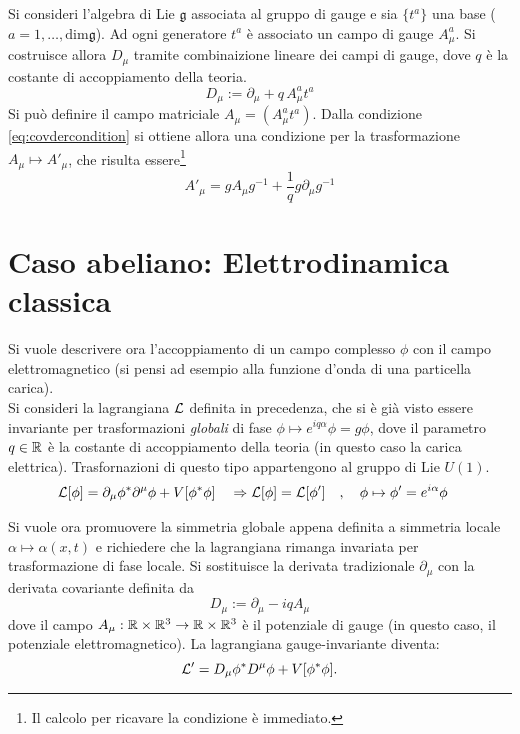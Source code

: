 Si consideri l'algebra di Lie $\mathfrak{g}$ associata al gruppo di gauge e sia
$\{ t^a \}$ una base ($a = 1, \dots, \mathrm{dim}\mathfrak{g}$). Ad ogni generatore
$ t^a $ è associato un campo di gauge $ A^a_\mu $. Si costruisce allora $ D _\mu $ tramite
combinaizione lineare dei campi di gauge, dove $q$ è la costante di accoppiamento della
teoria.
\begin{equation}
   D _\mu := \partial _\mu + q \, A^a_\mu t^a
\end{equation}
Si può definire il campo matriciale $A _\mu = (A^a_\mu t^a)$. Dalla condizione
\ref{eq:covdercondition} si ottiene allora una condizione per la trasformazione
 $A _\mu \mapsto A' _\mu$, che risulta essere\footnote{ Il calcolo per ricavare
la condizione è immediato.}
\begin{equation}\label{eq:gaugetrasform}
   A'_\mu = g A_\mu g^{-1} + \frac{1}{q} g \partial _\mu g^ {-1}
\end{equation}

\section{Caso abeliano: Elettrodinamica classica}
Si vuole descrivere ora l'accoppiamento di un campo complesso $\phi$ con il campo
elettromagnetico (si pensi ad esempio alla funzione d'onda di una particella carica).\\
Si consideri la lagrangiana $\mathcal{L}$ definita in precedenza, che si è già visto
essere invariante per trasformazioni \emph{globali} di fase $\phi \mapsto e^{iq\alpha}\phi = g\phi$,
dove il parametro $q \in \mathbb{R}$ è la costante di accoppiamento della teoria
(in questo caso la carica elettrica). Trasfornazioni di questo tipo appartengono
al gruppo di Lie $U(1)$.
%
\begin{equation*}
  \begin{aligned}
     \mathcal{L} [\phi] & = \partial _\mu \phi^*  \partial ^\mu \phi + V[\phi ^* \phi] &
     & \Rightarrow \mathcal{L}[\phi] = \mathcal{L}[\phi'] & ,\quad
     \phi &\mapsto \phi' = e^{i\alpha}\phi
  \end{aligned}
\end{equation*}

Si vuole ora promuovere la simmetria globale appena definita a simmetria locale
$\alpha \mapsto \alpha(x,t)$ e richiedere che la lagrangiana rimanga invariata
per trasformazione di fase locale.
Si sostituisce la derivata tradizionale $\partial _\mu$ con la derivata covariante
definita da
%
$$
   D _\mu := \partial _\mu -iq A _\mu
$$
dove il campo $A _\mu : \mathbb{R} \times \mathbb{R}^3 \to \mathbb{R} \times \mathbb{R}^3$ è il potenziale
di gauge (in questo caso, il potenziale elettromagnetico). La lagrangiana
gauge-invariante diventa:
$$
   \mathcal{L} ' =  D _\mu \phi^*  D ^\mu \phi + V[\phi ^* \phi].
$$

